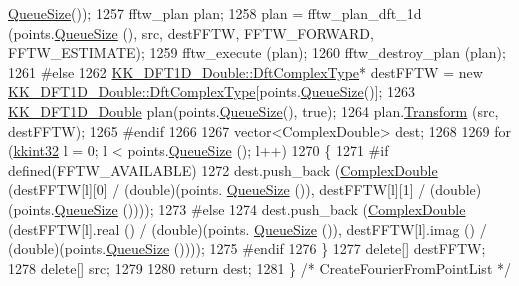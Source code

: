 \begin{DoxyCode}
      \hyperlink{class_k_k_b_1_1_k_k_queue_a1dab601f75ee6a65d97f02bddf71c40d}{QueueSize}());
1257     fftw\_plan       plan;
1258     plan = fftw\_plan\_dft\_1d (points.\hyperlink{class_k_k_b_1_1_k_k_queue_a1dab601f75ee6a65d97f02bddf71c40d}{QueueSize} (), src, destFFTW, FFTW\_FORWARD, FFTW\_ESTIMATE);
1259     fftw\_execute (plan);
1260     fftw\_destroy\_plan (plan);  
1261 \textcolor{preprocessor}{#else}
1262     \hyperlink{class_k_k_b_1_1_k_k___d_f_t1_d_a4cbc827157dd30ddec2d3753e552a827}{KK\_DFT1D\_Double::DftComplexType}*  destFFTW = \textcolor{keyword}{new} 
      \hyperlink{class_k_k_b_1_1_k_k___d_f_t1_d_a4cbc827157dd30ddec2d3753e552a827}{KK\_DFT1D\_Double::DftComplexType}[points.\hyperlink{class_k_k_b_1_1_k_k_queue_a1dab601f75ee6a65d97f02bddf71c40d}{QueueSize}()];
1263     \hyperlink{class_k_k_b_1_1_k_k___d_f_t1_d}{KK\_DFT1D\_Double}  plan(points.\hyperlink{class_k_k_b_1_1_k_k_queue_a1dab601f75ee6a65d97f02bddf71c40d}{QueueSize}(), \textcolor{keyword}{true});
1264     plan.\hyperlink{class_k_k_b_1_1_k_k___d_f_t1_d_a97bb58639bdc8f8bf1c11bda9bbd9d3d}{Transform} (src, destFFTW);
1265 \textcolor{preprocessor}{  #endif}
1266 
1267   vector<ComplexDouble>  dest;
1268 
1269   \textcolor{keywordflow}{for}  (\hyperlink{namespace_k_k_b_a8fa4952cc84fda1de4bec1fbdd8d5b1b}{kkint32}  l = 0;  l < points.\hyperlink{class_k_k_b_1_1_k_k_queue_a1dab601f75ee6a65d97f02bddf71c40d}{QueueSize} ();  l++)
1270   \{
1271 \textcolor{preprocessor}{    #if  defined(FFTW\_AVAILABLE)}
1272     dest.push\_back (\hyperlink{namespace_k_k_b_a307e28915a31eb2034af6cb1d0d5fb88}{ComplexDouble} (destFFTW[l][0] / (\textcolor{keywordtype}{double})(points.
      \hyperlink{class_k_k_b_1_1_k_k_queue_a1dab601f75ee6a65d97f02bddf71c40d}{QueueSize} ()), destFFTW[l][1] / (\textcolor{keywordtype}{double})(points.\hyperlink{class_k_k_b_1_1_k_k_queue_a1dab601f75ee6a65d97f02bddf71c40d}{QueueSize} ())));
1273 \textcolor{preprocessor}{    #else}
1274     dest.push\_back (\hyperlink{namespace_k_k_b_a307e28915a31eb2034af6cb1d0d5fb88}{ComplexDouble} (destFFTW[l].real () / (\textcolor{keywordtype}{double})(points.
      \hyperlink{class_k_k_b_1_1_k_k_queue_a1dab601f75ee6a65d97f02bddf71c40d}{QueueSize} ()), destFFTW[l].imag () / (double)(points.\hyperlink{class_k_k_b_1_1_k_k_queue_a1dab601f75ee6a65d97f02bddf71c40d}{QueueSize} ())));
1275 \textcolor{preprocessor}{    #endif}
1276   \}
1277   \textcolor{keyword}{delete}[]  destFFTW;
1278   \textcolor{keyword}{delete}[]  src;
1279 
1280   \textcolor{keywordflow}{return}  dest;
1281 \}  \textcolor{comment}{/* CreateFourierFromPointList */}
\end{DoxyCode}
